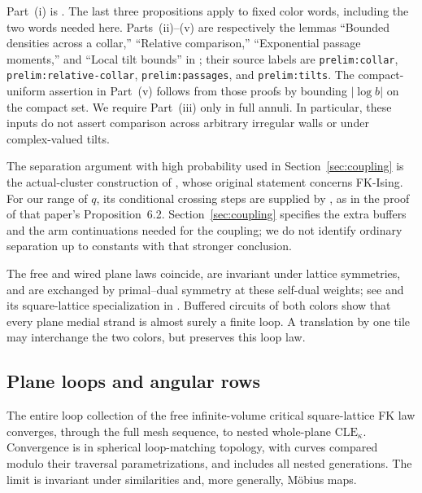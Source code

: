 Part~(i) is \cite[Theorem~1.2 and Propositions~6.2, 6.3, and~6.5]{DMT}.
The last three propositions apply to fixed color words, including the
two words needed here. Parts~(ii)--(v) are respectively the lemmas
``Bounded densities across a collar,'' ``Relative comparison,''
``Exponential passage moments,'' and ``Local tilt bounds'' in
\cite[Section ``Tiles, positive laws, and localization'']{FKCompanion};
their source labels are \texttt{prelim:collar},
\texttt{prelim:relative-collar}, \texttt{prelim:passages}, and
\texttt{prelim:tilts}. The compact-uniform assertion in Part~(v)
follows from those proofs by bounding $|\log b|$ on the compact set.
We require Part~(iii) only in full annuli. In particular, these inputs
do not assert comparison across arbitrary irregular walls or under
complex-valued tilts.

The separation argument with high probability used in
Section~\ref{sec:coupling} is the actual-cluster construction of
\cite[Lemma~5.9]{CDCH}, whose original statement concerns FK-Ising.
For our range of $q$, its conditional crossing steps are supplied by
\cite[Theorem~1.2]{DMT}, as in the proof of that paper's
Proposition~6.2. Section~\ref{sec:coupling} specifies the extra buffers
and the arm continuations needed for the coupling; we do not identify
ordinary separation up to constants with that stronger conclusion.

The free and wired plane laws coincide, are invariant under lattice
symmetries, and are exchanged by primal--dual symmetry at these
self-dual weights; see \cite[Theorem~1.1]{DCLM} and its square-lattice
specialization in \cite[Section ``Crossing estimates and finite plane
loops'']{FKCompanion}. Buffered circuits of both colors show that
every plane medial strand is almost surely a finite loop. A translation
by one tile may interchange the two colors, but preserves this loop law.

\subsection{Plane loops and angular rows}

\begin{standinginput}\label{inp:loops}
The entire loop collection of the free infinite-volume critical
square-lattice FK law converges, through the full mesh sequence, to
nested whole-plane $\mathrm{CLE}_\kappa$. Convergence is in spherical
loop-matching topology, with curves compared modulo their traversal
parametrizations, and includes all nested generations. The limit is
invariant under similarities and, more generally, M\"obius maps.
\end{standinginput}

